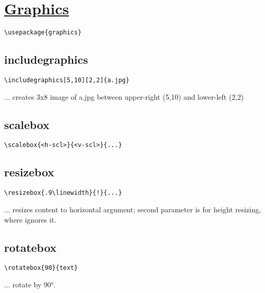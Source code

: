 \section{\href{http://mirrors.ctan.org/macros/latex/required/graphics/graphics.pdf}{Graphics}}
\begin{lstlisting}
\usepackage{graphics}
\end{lstlisting}


\subsection*{includegraphics}
\begin{lstlisting}
\includegraphics[5,10][2,2]{a.jpg}
\end{lstlisting}
... creates 3x8 image of a.jpg between upper-right (5,10) and lower-left (2,2)


\subsection*{scalebox}
\begin{lstlisting}
\scalebox{<h-scl>}{<v-scl>}{...}
\end{lstlisting}


\subsection*{resizebox}
\begin{lstlisting}
\resizebox{.9\linewidth}{!}{...}
\end{lstlisting}
... resizes content to horizontal argument; second parameter is for height resizing, where \say{!} ignores it.


\subsection*{rotatebox}
\begin{lstlisting}
\rotatebox{90}{text}
\end{lstlisting}
... rotate  by \ang{90}.


